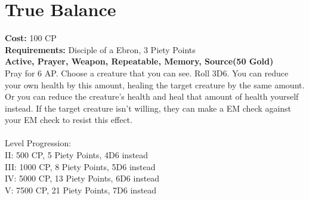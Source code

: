 \section{True Balance}
\textbf{Cost:} 100 CP\\
\textbf{Requirements:} Disciple of a Ebron, 3 Piety Points \\
\textbf{Active, Prayer, Weapon, Repeatable, Memory, Source(50 Gold)}\\
Pray for 6 AP. Choose a creature that you can see. Roll 3D6. You can reduce your own health by this amount, healing the target creature by the same amount. Or you can reduce the creature's health and heal that amount of health yourself instead. If the target creature isn't willing, they can make a EM check against your EM check to resist this effect.\\
\\
Level Progression:\\
II: 500 CP, 5 Piety Points, 4D6 instead\\
III: 1000 CP, 8 Piety Points, 5D6 instead\\
IV: 5000 CP, 13 Piety Points, 6D6 instead\\
V: 7500 CP, 21 Piety Points, 7D6 instead\\